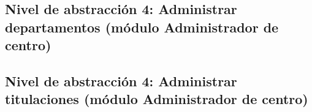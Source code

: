 \subsection{Nivel de abstracción 4: Administrar departamentos (módulo Administrador de centro)}



\subsection{Nivel de abstracción 4: Administrar titulaciones (\-mó\-dulo Administrador de centro)}


%
%
% 
%
%
% 
%
%
% 
